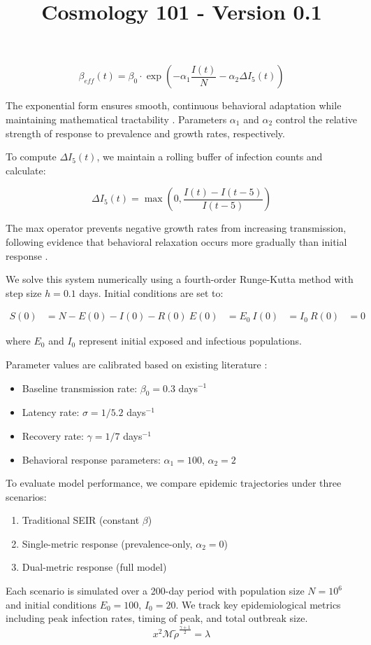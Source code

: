 \documentclass{article}\usepackage{graphicx} \usepackage{amsmath} \usepackage{colortbl}\title{Cosmology 101 - Version 0.1}
\begin{document}
\begin{equation}
\beta_{eff}(t) = \beta_0 \cdot \exp\left(-\alpha_1\frac{I(t)}{N} - \alpha_2\Delta I_5(t)\right)
\end{equation}

The exponential form ensures smooth, continuous behavioral adaptation while maintaining mathematical tractability \cite{wang2015coupled}. Parameters $\alpha_1$ and $\alpha_2$ control the relative strength of response to prevalence and growth rates, respectively.

To compute $\Delta I_5(t)$, we maintain a rolling buffer of infection counts and calculate:

\begin{equation}
\Delta I_5(t) = \max\left(0, \frac{I(t) - I(t-5)}{I(t-5)}\right)
\end{equation}

The max operator prevents negative growth rates from increasing transmission, following evidence that behavioral relaxation occurs more gradually than initial response \cite{funk2009spread}.

We solve this system numerically using a fourth-order Runge-Kutta method with step size $h=0.1$ days. Initial conditions are set to:

\begin{equation}
\begin{aligned}
S(0) &= N - E(0) - I(0) - R(0) \
E(0) &= E_0 \
I(0) &= I_0 \
R(0) &= 0
\end{aligned}
\end{equation}

where $E_0$ and $I_0$ represent initial exposed and infectious populations.

Parameter values are calibrated based on existing literature \cite{anderson1992infectious}:
\begin{itemize}
    \item Baseline transmission rate: $\beta_0 = 0.3$ days$^{-1}$
    \item Latency rate: $\sigma = 1/5.2$ days$^{-1}$
    \item Recovery rate: $\gamma = 1/7$ days$^{-1}$
    \item Behavioral response parameters: $\alpha_1 = 100$, $\alpha_2 = 2$
\end{itemize}

To evaluate model performance, we compare epidemic trajectories under three scenarios:
\begin{enumerate}
    \item Traditional SEIR (constant $\beta$)
    \item Single-metric response (prevalence-only, $\alpha_2 = 0$)
    \item Dual-metric response (full model)
\end{enumerate}

Each scenario is simulated over a 200-day period with population size $N = 10^6$ and initial conditions $E_0 = 100$, $I_0 = 20$. We track key epidemiological metrics including peak infection rates, timing of peak, and total outbreak size. \begin{equation}x^2 \mathcal{M} \tilde{\rho }^{\frac{\gamma +1}{2}}=\lambda \label{Mi ecuacion 8} \end{equation}
\end{document}
